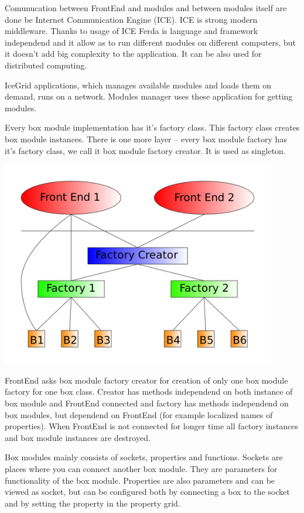 \documentclass{article}
\begin{document}
Comunucation between FrontEnd and modules and between modules itself are done be Internet Communication Engine (ICE). ICE is strong modern middleware. Thanks to usage of ICE Ferda is language and framework independend and it allow as to run different modules on different computers, but it doesn't add big complexity to the application. It can be also used for distributed computing.

IceGrid applications, which manages available modules and loads them on demand, runs on a network. Modules manager uses these application for getting modules.

Every box module implementation has it's factory class. This factory class creates box module instances. There is one more layer -- every box module factory has it's factory class, we call it box module factory creator. It is used as singleton.

\noindent\includegraphics[width=12cm]{creatorFactory}

FrontEnd asks box module factory creator for creation of only one box module factory for one box class. Creator has methods independend on both instance of box module and FrontEnd connected and factory has methods independend on box modules, but dependend on FrontEnd (for example localized names of properties). When FrontEnd is not connected for longer time all factory instances and box module instances are destroyed.

Box modules mainly consists of sockets, properties and functions. Sockets are places where you can connect another box module. They are parameters for functionality of the box module. Properties are also parameters and can be viewed as socket, but can be configured both by connecting a box to the socket and by setting the property in the property grid.
\end{document}
